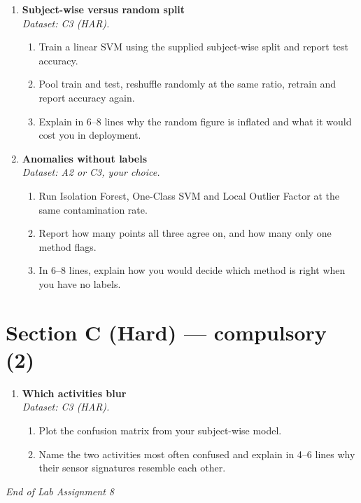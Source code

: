 \documentclass[11pt,a4paper]{article}
\begin{document}
\begin{enumerate}[label=\textbf{B\arabic*.}, leftmargin=*]

  \item \textbf{Subject-wise versus random split} \\
    \emph{Dataset: C3 (HAR).}
    \begin{enumerate}[label=(\alph*), leftmargin=*]
      \item Train a linear SVM using the supplied subject-wise split and report test accuracy.
      \item Pool train and test, reshuffle randomly at the same ratio, retrain and report accuracy again.
      \item Explain in 6--8 lines why the random figure is inflated and what it would cost you in deployment.
    \end{enumerate}

  \item \textbf{Anomalies without labels} \\
    \emph{Dataset: A2 or C3, your choice.}
    \begin{enumerate}[label=(\alph*), leftmargin=*]
      \item Run Isolation Forest, One-Class SVM and Local Outlier Factor at the same contamination rate.
      \item Report how many points all three agree on, and how many only one method flags.
      \item In 6--8 lines, explain how you would decide which method is right when you have no labels.
    \end{enumerate}

\end{enumerate}

\section*{Section C (Hard) --- compulsory \quad (2)}

\begin{enumerate}[label=\textbf{C\arabic*.}, leftmargin=*]

  \item \textbf{Which activities blur} \\
    \emph{Dataset: C3 (HAR).}
    \begin{enumerate}[label=(\alph*), leftmargin=*]
      \item Plot the confusion matrix from your subject-wise model.
      \item Name the two activities most often confused and explain in 4--6 lines why their sensor signatures resemble each other.
    \end{enumerate}

\end{enumerate}

\vfill\noindent\textit{End of Lab Assignment 8}

\notesources{\AMLLabSources}
\end{document}

